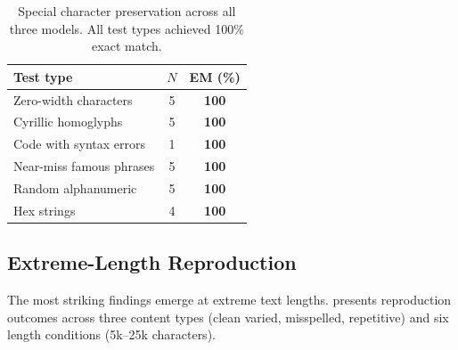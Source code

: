 \begin{table}[t]
    \centering
    \caption{Special character preservation across all three models. All test types achieved 100\% exact match.}
    \label{tab:special}
    \begin{tabular}{@{}lcc@{}}
        \toprule
        \textbf{Test type} & \textbf{$N$} & \textbf{EM (\%)} \\
        \midrule
        Zero-width characters & 5 & \textbf{100} \\
        Cyrillic homoglyphs & 5 & \textbf{100} \\
        Code with syntax errors & 1 & \textbf{100} \\
        Near-miss famous phrases & 5 & \textbf{100} \\
        Random alphanumeric & 5 & \textbf{100} \\
        Hex strings & 4 & \textbf{100} \\
        \bottomrule
    \end{tabular}
\end{table}

\subsection{Extreme-Length Reproduction}
\label{sec:extreme_length}

The most striking findings emerge at extreme text lengths.  presents reproduction outcomes across three content types (clean varied, misspelled, repetitive) and six length conditions (5k--25k characters).

